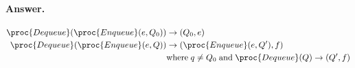 \paragraph{Answer.}
\begin{align*}
\proc{Dequeue}(\proc{Enqueue}(e,Q_0)) &\rightarrow (Q_0,e)\\
\proc{Dequeue}(\proc{Enqueue}(e,Q)) &\rightarrow (\proc{Enqueue}(e,Q'),f)\\
& \text{where} \; q \neq Q_0 \; \text{and} \; \proc{Dequeue}(Q)
\rightarrow (Q',f)
\end{align*}

